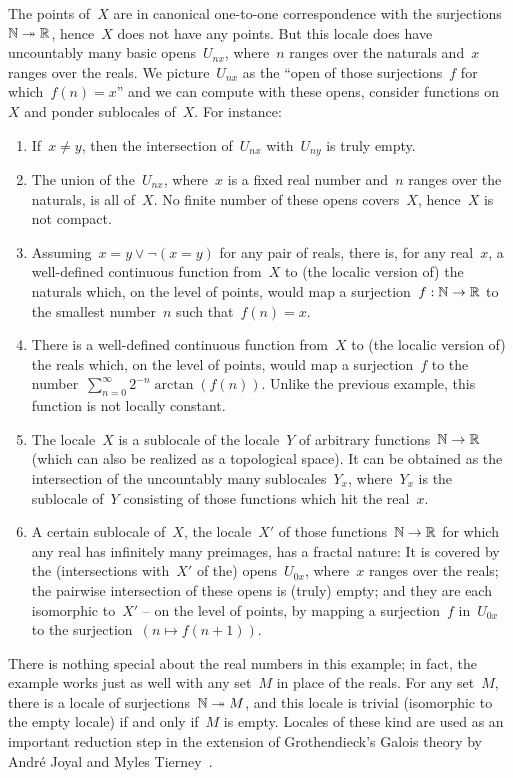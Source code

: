 \documentclass{ws-rv9x6}
\begin{document}
{The points of~$X$ are in canonical one-to-one correspondence with the
surjections~$\mathbb{N} \twoheadrightarrow \mathbb{R}$, hence~$X$ does not have any points.
But this locale does have uncountably many basic opens~$U_{nx}$, where~$n$
ranges over the naturals and~$x$ ranges over the reals. We picture~$U_{nx}$ as
the ``open of those surjections~$f$ for which~$f(n) = x$'' and we can compute with
these opens, consider functions on~$X$ and ponder sublocales of~$X$. For instance:
\begin{enumerate}
\item If~$x \neq y$, then the intersection of~$U_{nx}$ with~$U_{ny}$
is truly empty.
\item The union of the~$U_{nx}$, where~$x$ is a fixed real
number and~$n$ ranges over the naturals, is all of~$X$. No finite number
of these opens covers~$X$, hence~$X$ is not compact.
\item Assuming~$x = y \vee \neg(x = y)$ for any pair of reals, there is, for any real~$x$, a well-defined continuous function from~$X$ to
(the localic version of) the naturals which, on the level of points, would map
a surjection~$f : \mathbb{N} \to \mathbb{R}$ to the smallest number~$n$ such that~$f(n) = x$.
\item There is a well-defined continuous function from~$X$ to (the localic
version of) the reals which, on the level of points, would map a surjection~$f$
to the number~$\sum_{n=0}^\infty 2^{-n} \arctan(f(n))$. Unlike the previous
example, this function is not locally constant.
\item\label{item:intersection-sublocales} The locale~$X$ is a sublocale of the
locale~$Y$ of arbitrary functions~$\mathbb{N} \to \mathbb{R}$ (which can also be realized as
a topological space). It can be obtained as the intersection of the uncountably
many sublocales~$Y_x$, where~$Y_x$ is the sublocale of~$Y$ consisting of those
functions which hit the real~$x$.
\item A certain sublocale of~$X$, the locale~$X'$ of those functions~$\mathbb{N} \to
\mathbb{R}$ for which any real has infinitely many preimages, has a fractal nature: It
is covered by the (intersections with~$X'$ of the) opens~$U_{0x}$, where~$x$ ranges over the reals; the pairwise
intersection of these opens is (truly) empty; and they are each isomorphic
to~$X'$ -- on the level of points, by mapping a surjection~$f$ in~$U_{0x}$ to
the surjection~$(n \mapsto f(n+1))$.
\end{enumerate}

There is nothing special about the real numbers in this example;
in fact, the example works just as well with any set~$M$ in place of the reals.
For any set~$M$, there is a locale of surjections~$\mathbb{N} \twoheadrightarrow M$,
and this locale is trivial (isomorphic to the empty locale) if and only if~$M$
is empty. Locales of these kind are used as an important reduction step in the
extension of Grothendieck's Galois theory by André Joyal and
Myles Tierney~\cite[Section~V.3]{joyal-tierney:galois-theory}.


}
\end{document}
